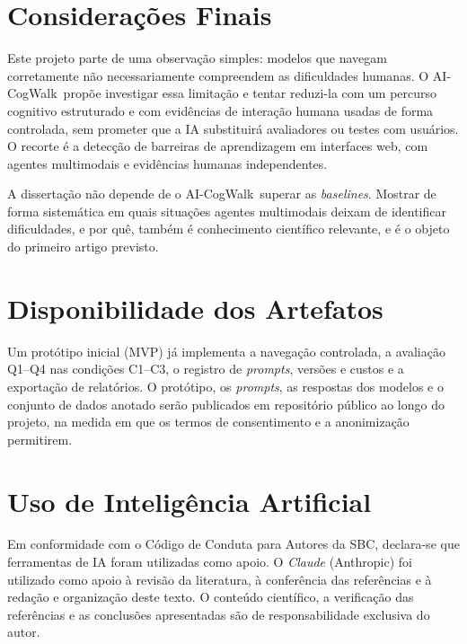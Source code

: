\documentclass[12pt]{article}
\newcommand{\proj}{AI-CogWalk}
\begin{document}
\section{Considerações Finais}
\label{sec:final}

Este projeto parte de uma observação simples: modelos que navegam corretamente não necessariamente compreendem as dificuldades humanas. O \proj\ propõe investigar essa limitação e tentar reduzi-la com um percurso cognitivo estruturado e com evidências de interação humana usadas de forma controlada, sem prometer que a IA substituirá avaliadores ou testes com usuários. O recorte é a detecção de barreiras de aprendizagem em interfaces web, com agentes multimodais e evidências humanas independentes.

A dissertação não depende de o \proj\ superar as \textit{baselines}. Mostrar de forma sistemática em quais situações agentes multimodais deixam de identificar dificuldades, e por quê, também é conhecimento científico relevante, e é o objeto do primeiro artigo previsto.

\section*{Disponibilidade dos Artefatos}
{\small
Um protótipo inicial (MVP) já implementa a navegação controlada, a avaliação Q1--Q4 nas condições C1--C3, o registro de \textit{prompts}, versões e custos e a exportação de relatórios. O protótipo, os \textit{prompts}, as respostas dos modelos e o conjunto de dados anotado serão publicados em repositório público ao longo do projeto, na medida em que os termos de consentimento e a anonimização permitirem.
}

\section*{Uso de Inteligência Artificial}
{\small
Em conformidade com o Código de Conduta para Autores da SBC, declara-se que ferramentas de IA foram utilizadas como apoio. O \textit{Claude} (Anthropic) foi utilizado como apoio à revisão da literatura, à conferência das referências e à redação e organização deste texto. O conteúdo científico, a verificação das referências e as conclusões apresentadas são de responsabilidade exclusiva do autor.
}



\end{document}
